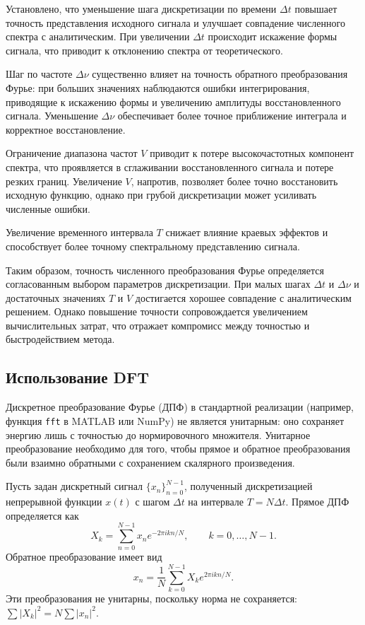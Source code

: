 \documentclass[a4paper, 12pt]{article}
\begin{document}
Установлено, что уменьшение шага дискретизации по времени $\Delta t$ повышает точность представления исходного сигнала и улучшает совпадение численного спектра с аналитическим. При увеличении $\Delta t$ происходит искажение формы сигнала, что приводит к отклонению спектра от теоретического.

Шаг по частоте $\Delta \nu$ существенно влияет на точность обратного преобразования Фурье: при больших значениях наблюдаются ошибки интегрирования, приводящие к искажению формы и увеличению амплитуды восстановленного сигнала. Уменьшение $\Delta \nu$ обеспечивает более точное приближение интеграла и корректное восстановление.

Ограничение диапазона частот $V$ приводит к потере высокочастотных компонент спектра, что проявляется в сглаживании восстановленного сигнала и потере резких границ. Увеличение $V$, напротив, позволяет более точно восстановить исходную функцию, однако при грубой дискретизации может усиливать численные ошибки.

Увеличение временного интервала $T$ снижает влияние краевых эффектов и способствует более точному спектральному представлению сигнала.

Таким образом, точность численного преобразования Фурье определяется согласованным выбором параметров дискретизации. При малых шагах $\Delta t$ и $\Delta \nu$ и достаточных значениях $T$ и $V$ достигается хорошее совпадение с аналитическим решением. Однако повышение точности сопровождается увеличением вычислительных затрат, что отражает компромисс между точностью и быстродействием метода.


\subsection{Использование DFT}
Дискретное преобразование Фурье (ДПФ) в стандартной реализации (например, функция \texttt{fft} в MATLAB или NumPy) не является унитарным: оно сохраняет энергию лишь с точностью до нормировочного множителя. Унитарное преобразование необходимо для того, чтобы прямое и обратное преобразования были взаимно обратными с сохранением скалярного произведения.

Пусть задан дискретный сигнал $\{x_n\}_{n=0}^{N-1}$, полученный дискретизацией непрерывной функции $x(t)$ с шагом $\Delta t$ на интервале $T = N \Delta t$. Прямое ДПФ определяется как
\[
X_k = \sum_{n=0}^{N-1} x_n e^{-2\pi i k n / N}, \qquad k = 0,\dots,N-1.
\]
Обратное преобразование имеет вид
\[
x_n = \frac{1}{N} \sum_{k=0}^{N-1} X_k e^{2\pi i k n / N}.
\]
Эти преобразования не унитарны, поскольку норма не сохраняется: $\sum |X_k|^2 = N \sum |x_n|^2$.
\end{document}
